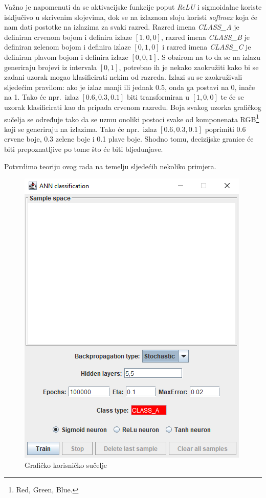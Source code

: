 \documentclass[times, utf8, zavrsni]{fer}
\begin{document}
Važno je napomenuti da se aktivacijske funkcije poput \textit{ReLU} i sigmoidalne koriste isključivo u skrivenim slojevima, dok se na izlaznom sloju koristi \textit{\textit{softmax}} koja će nam dati postotke na izlazima za svaki razred. Razred imena \textit{CLASS\_A} je definiran crvenom bojom i definira izlaze $[1,0,0]$, razred imena \textit{CLASS\_B} je definiran zelenom bojom i definira izlaze $[0,1,0]$ i razred imena \textit{CLASS\_C} je definiran plavom bojom i definira izlaze $[0,0,1]$. S obzirom na to da se na izlazu generiraju brojevi iz intervala $[0,1]$, potrebno ih je nekako zaokružiti kako bi se zadani uzorak mogao klasificirati nekim od razreda. Izlazi su se zaokruživali sljedećim pravilom: ako je izlaz manji ili jednak 0.5, onda ga postavi na 0, inače na 1. Tako će npr.\ izlaz $[0.6,0.3,0.1]$ biti transformiran u $[1,0,0]$ te će se uzorak klasificirati kao da pripada crvenom razredu. Boja svakog uzorka grafičkog sučelja se određuje tako da se uzmu onoliki postoci svake od komponenata RGB\footnote{Red, Green, Blue.} koji se generiraju na izlazima. Tako će npr.\ izlaz $[0.6,0.3,0.1]$ poprimiti 0.6 crvene boje, 0.3 zelene boje i 0.1 plave boje. Shodno tomu, decizijske granice će biti prepoznatljive po tome što će biti bljedunjave. 

Potvrdimo teoriju ovog rada na temelju sljedećih nekoliko primjera.

\begin{figure}[H]
    \centering
    \includegraphics[scale=0.6]{img/gui.png}
    \caption[Caption for LOF]{Grafičko korisničko sučelje}
    \label{fig:gui}
\end{figure}
\end{document}
